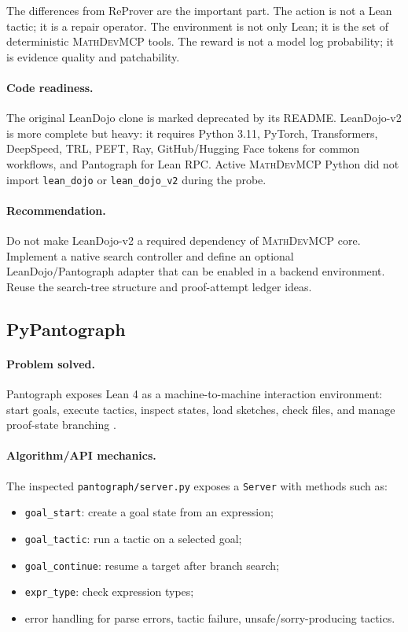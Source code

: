 \documentclass[11pt]{article}
\newcommand{\MathDevMCP}{\textsc{MathDevMCP}}
\begin{document}
The differences from ReProver are the important part. The action is not a Lean
tactic; it is a repair operator. The environment is not only Lean; it is the
set of deterministic \MathDevMCP{} tools. The reward is not a model log
probability; it is evidence quality and patchability.

\paragraph{Code readiness.}
The original LeanDojo clone is marked deprecated by its README. LeanDojo-v2 is
more complete but heavy: it requires Python 3.11, PyTorch, Transformers,
DeepSpeed, TRL, PEFT, Ray, GitHub/Hugging Face tokens for common workflows, and
Pantograph for Lean RPC. Active \MathDevMCP{} Python did not import
\texttt{lean\_dojo} or \texttt{lean\_dojo\_v2} during the probe.

\paragraph{Recommendation.}
Do not make LeanDojo-v2 a required dependency of \MathDevMCP{} core. Implement
a native search controller and define an optional LeanDojo/Pantograph adapter
that can be enabled in a backend environment. Reuse the search-tree structure
and proof-attempt ledger ideas.

\subsection{PyPantograph}

\paragraph{Problem solved.}
Pantograph exposes Lean 4 as a machine-to-machine interaction environment:
start goals, execute tactics, inspect states, load sketches, check files, and
manage proof-state branching \cite{pantographgithub}.

\paragraph{Algorithm/API mechanics.}
The inspected \texttt{pantograph/server.py} exposes a \texttt{Server} with
methods such as:

\begin{itemize}[leftmargin=*]
\item \texttt{goal\_start}: create a goal state from an expression;
\item \texttt{goal\_tactic}: run a tactic on a selected goal;
\item \texttt{goal\_continue}: resume a target after branch search;
\item \texttt{expr\_type}: check expression types;
\item error handling for parse errors, tactic failure, unsafe/sorry-producing
  tactics.
\end{itemize}
\end{document}
